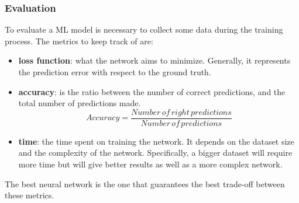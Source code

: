 \documentclass[../thesis.tex]{subfiles}
\begin{document}
\subsubsection{Evaluation}
To evaluate a \acrshort{ML} model is necessary to collect some data during the training process. The metrics to keep track of are:
\begin{itemize}
    \item \textbf{loss function}: what the network aims to minimize. Generally, it represents the prediction error with respect to the ground truth.
    \item \textbf{accuracy}: is the ratio between the number of correct predictions, and the total number of predictions made.
        \begin{equation}
                Accuracy = \frac{Number\, of\, right\, predictions}{Number\, of\, predictions}
        \end{equation}
    \item \textbf{time}: the time spent on training the network. It depends on the dataset size and the complexity of the network. Specifically, a bigger dataset will require more time but will give better results as well as a more complex network.
\end{itemize}
The best neural network is the one that guarantees the best trade-off between these metrics.
\end{document}
